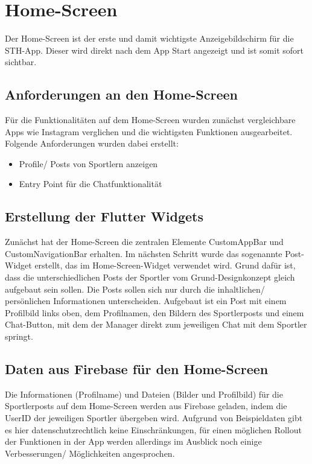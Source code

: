 \chapter{Home-Screen}
Der Home-Screen ist der erste und damit wichtigste Anzeigebildschirm für die STH-App. 
Dieser wird direkt nach dem App Start angezeigt und ist somit sofort sichtbar.
\section{Anforderungen an den Home-Screen}
Für die Funktionalitäten auf dem Home-Screen wurden zunächst vergleichbare Apps wie Instagram verglichen und die wichtigsten Funktionen ausgearbeitet.\newline
Folgende Anforderungen wurden dabei erstellt:
\begin{itemize}
    \item Profile/ Posts von Sportlern anzeigen
    \item Entry Point für die Chatfunktionalität
\end{itemize}

\section{Erstellung der Flutter Widgets}
Zunächst hat der Home-Screen die zentralen Elemente CustomAppBar und CustomNavigationBar erhalten.
Im nächsten Schritt wurde das sogenannte Post-Widget erstellt, das im Home-Screen-Widget verwendet wird.
Grund dafür ist, dass die unterschiedlichen Posts der Sportler vom Grund-Designkonzept gleich aufgebaut sein sollen. 
Die Posts sollen sich nur durch die inhaltlichen/ persönlichen Informationen unterscheiden.\newline
Aufgebaut ist ein Post mit einem Profilbild links oben, dem Profilnamen, den Bildern des Sportlerposts und einem Chat-Button, mit dem der Manager direkt zum jeweiligen Chat mit dem Sportler springt.

\section{Daten aus Firebase für den Home-Screen}
Die Informationen (Profilname) und Dateien (Bilder und Profilbild) für die Sportlerposts auf dem Home-Screen werden aus Firebase geladen, indem die UserID der jeweiligen Sportler übergeben wird.
Aufgrund von Beispieldaten gibt es hier datenschutzrechtlich keine Einschränkungen, für einen möglichen Rollout der Funktionen in der App werden allerdings im Ausblick noch einige Verbesserungen/ Möglichkeiten angesprochen.

